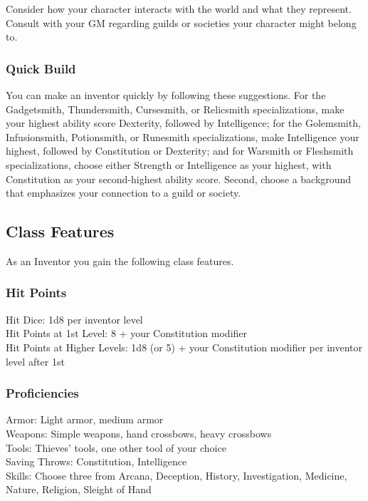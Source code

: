 \documentclass[11pt,twoside,openany]{book}  %
\begin{document}
Consider how your character interacts with the world and what they represent. Consult with your GM regarding guilds or societies your character might belong to.

\subsubsection{Quick Build}

You can make an inventor quickly by following these suggestions. For the Gadgetsmith, Thundersmith, Cursesmith, or Relicsmith specializations, make your highest ability score Dexterity, followed by Intelligence; for the Golemsmith, Infusionsmith, Potionsmith, or Runesmith specializations, make Intelligence your highest, followed by Constitution or Dexterity; and for Warsmith or Fleshsmith specializations, choose either Strength or Intelligence as your highest, with Constitution as your second-highest ability score. Second, choose a background that emphasizes your connection to a guild or society.
\subsection{Class Features}

As an Inventor you gain the following class features.

\subsubsection{Hit Points}

Hit Dice: 1d8 per inventor level \\
Hit Points at 1st Level: 8 + your Constitution modifier \\
Hit Points at Higher Levels: 1d8 (or 5) + your Constitution modifier per inventor level after 1st

\subsubsection{Proficiencies}

Armor: Light armor, medium armor \\
Weapons: Simple weapons, hand crossbows, heavy crossbows \\
Tools: Thieves’ tools, one other tool of your choice \\
Saving Throws: Constitution, Intelligence \\
Skills: Choose three from Arcana, Deception, History, Investigation, Medicine, Nature, Religion, Sleight of Hand
\end{document}
